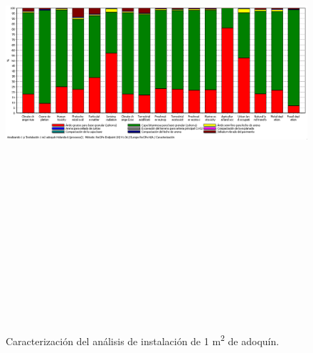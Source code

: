 \begin{figure}[!htb]
\centering
\includegraphics[angle=90,height=19cm]{instalacion_caracterizacion.png}
\caption{Caracterización del análisis de instalación de 1 \si{m^2} de adoquín.}
\label{fig:caracterizacioninstalacion}
\end{figure}

